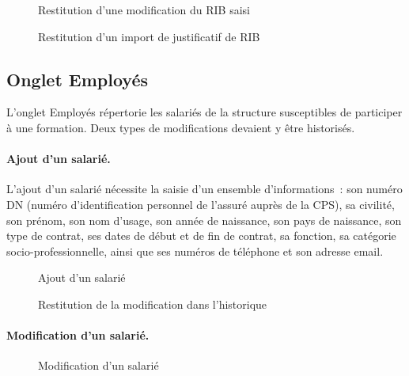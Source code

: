 \begin{figure}[H]
  \centering
  \caption{Restitution d'une modification du RIB saisi}
  \label{fig:modif-rib-ecrit}
\end{figure}

\begin{figure}[H]
  \centering
  \caption{Restitution d'un import de justificatif de RIB}
  \label{fig:modif-import-rib}
\end{figure}

\subsection{Onglet Employés}

L'onglet Employés répertorie les salariés de la structure susceptibles
de participer à une formation. Deux types de modifications devaient y
être historisés.

\paragraph{Ajout d'un salarié.} L'ajout d'un salarié nécessite la saisie
d'un ensemble d'informations~: son numéro DN (numéro d'identification
personnel de l'assuré auprès de la CPS), sa civilité, son prénom, son
nom d'usage, son année de naissance, son pays de naissance, son type de
contrat, ses dates de début et de fin de contrat, sa fonction, sa
catégorie socio-professionnelle, ainsi que ses numéros de téléphone et
son adresse email.

\begin{figure}[H]
  \centering
  \caption{Ajout d'un salarié}
  \label{fig:ajout-salarie}
\end{figure}

\begin{figure}[H]
  \centering
  \caption{Restitution de la modification dans l'historique}
  \label{fig:ajout-salarie-hist}
\end{figure}

\paragraph{Modification d'un salarié.}

\begin{figure}[H]
  \centering
  \caption{Modification d'un salarié}
  \label{fig:modif-salarie}
\end{figure}

